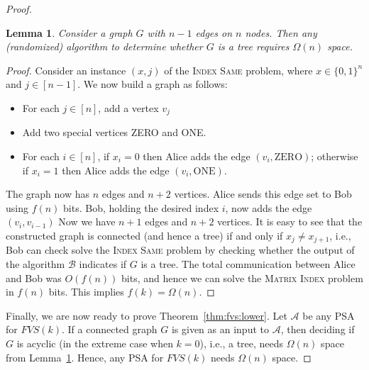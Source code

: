 \documentclass[11pt,letter]{article}
\newtheorem{lemma}[theorem]{Lemma}
\begin{document}
\begin{proof}
{\begin{lemma}
Consider a graph $G$ with $n-1$ edges on $n$ nodes. Then any (randomized) algorithm to determine whether $G$ is a tree requires $\Omega(n)$ space. \label{thm:lower-bound-checking-tree}
\end{lemma}
\begin{proof}
Consider an instance $(x,j)$ of the \textsc{Index Same} problem, where $x\in \{0,1\}^n$ and $j\in [n-1]$. We now build a graph as follows:
\begin{itemize}
\item For each $j\in [n]$, add a vertex $v_j$
\item Add two special vertices ZERO and ONE.
\item For each $i\in [n]$, if $x_i = 0$ then Alice adds the edge $(v_{i},\text{ZERO})$; otherwise if $x_i = 1$ then Alice adds the edge $(v_{i},\text{ONE})$.
\end{itemize}
The graph now has $n$ edges and $n+2$ vertices. Alice sends this edge
set to Bob using $f(n)$ bits.
Bob, holding the desired index $i$, now adds the edge $(v_{i},v_{i-1})$
Now we have $n+1$ edges and $n+2$ vertices. It is easy to see that the
constructed graph is connected (and hence a tree) if and only if
$x_{j}\neq x_{j+1}$, i.e., Bob can check solve the \textsc{Index Same}
problem by checking whether the output of the algorithm $\mathcal{B}$
indicates if $G$ is a tree.
The total communication between Alice and Bob was $O(f(n))$ bits, and hence we can solve the \textsc{Matrix Index} problem in $f(n)$ bits. This implies $f(k)=\Omega(n)$.
\end{proof}

Finally, we are now ready to prove Theorem~\ref{thm:fvs:lower}.
Let $\mathcal{A}$ be any PSA for $FVS(k)$. If a connected graph $G$ is
given as an input to $\mathcal{A}$, then deciding if $G$ is acyclic
(in the extreme case when $k=0$),
i.e., a tree, needs $\Omega(n)$ space from Lemma~\ref{thm:lower-bound-checking-tree}. Hence, any PSA for $FVS(k)$ needs $\Omega(n)$ space.
}
\end{proof}
\end{document}
